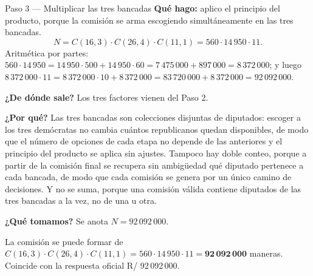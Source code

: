 \documentclass[11pt]{article}
\begin{document}
\begin{paso}{Paso 3 --- Multiplicar las tres bancadas}
\textbf{Qué hago:} aplico el principio del producto, porque la comisión se arma escogiendo simultáneamente en las tres bancadas.
\[
  N = C(16,3)\cdot C(26,4)\cdot C(11,1) = 560\cdot 14\,950\cdot 11 .
\]
Aritmética por partes: $560\cdot 14\,950 = 14\,950\cdot 500 + 14\,950\cdot 60 = 7\,475\,000 + 897\,000 = 8\,372\,000$; y luego $8\,372\,000\cdot 11 = 8\,372\,000\cdot 10 + 8\,372\,000 = 83\,720\,000 + 8\,372\,000 = 92\,092\,000$.

\textbf{¿De dónde sale?} Los tres factores vienen del Paso 2.

\textbf{¿Por qué?} Las tres bancadas son colecciones disjuntas de diputados: escoger a los tres demócratas no cambia cuántos republicanos quedan disponibles, de modo que el número de opciones de cada etapa no depende de las anteriores y el principio del producto se aplica sin ajustes. Tampoco hay doble conteo, porque a partir de la comisión final se recupera sin ambigüedad qué diputado pertenece a cada bancada, de modo que cada comisión se genera por un único camino de decisiones. Y no se suma, porque una comisión válida contiene diputados de las tres bancadas a la vez, no de una u otra.

\textbf{¿Qué tomamos?} Se anota $N=92\,092\,000$.
\end{paso}

\begin{resp}
La comisión se puede formar de $C(16,3)\cdot C(26,4)\cdot C(11,1)=560\cdot 14\,950\cdot 11=\mathbf{92\,092\,000}$ maneras. Coincide con la respuesta oficial R/ 92\,092\,000.
\end{resp}
\end{document}
